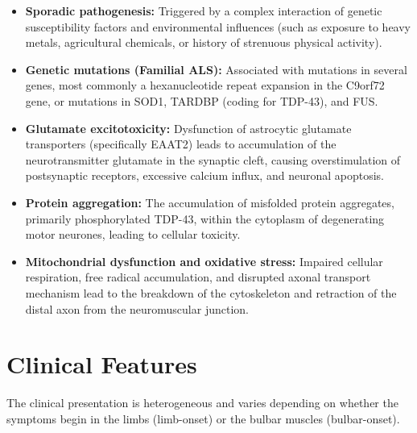 \begin{itemize}
    \item \textbf{Sporadic pathogenesis:} Triggered by a complex interaction of genetic susceptibility factors and environmental influences (such as exposure to heavy metals, agricultural chemicals, or history of strenuous physical activity).
    \item \textbf{Genetic mutations (Familial ALS):} Associated with mutations in several genes, most commonly a hexanucleotide repeat expansion in the C9orf72 gene, or mutations in SOD1, TARDBP (coding for TDP-43), and FUS.
    \item \textbf{Glutamate excitotoxicity:} Dysfunction of astrocytic glutamate transporters (specifically EAAT2) leads to accumulation of the neurotransmitter glutamate in the synaptic cleft, causing overstimulation of postsynaptic receptors, excessive calcium influx, and neuronal apoptosis.
    \item \textbf{Protein aggregation:} The accumulation of misfolded protein aggregates, primarily phosphorylated TDP-43, within the cytoplasm of degenerating motor neurones, leading to cellular toxicity.
    \item \textbf{Mitochondrial dysfunction and oxidative stress:} Impaired cellular respiration, free radical accumulation, and disrupted axonal transport mechanism lead to the breakdown of the cytoskeleton and retraction of the distal axon from the neuromuscular junction.
\end{itemize}

\section*{Clinical Features}
The clinical presentation is heterogeneous and varies depending on whether the symptoms begin in the limbs (limb-onset) or the bulbar muscles (bulbar-onset).

